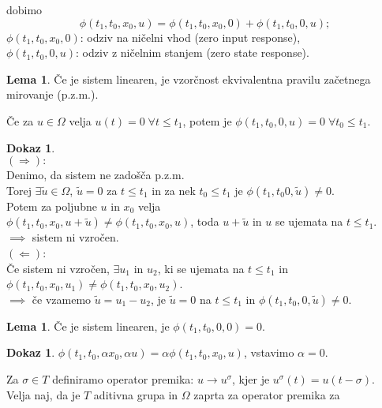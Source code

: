 \documentclass[a4paper, 12pt]{book}
\theoremstyle{definition}
\newtheorem{lemma}[counter]{Lema}
\newtheorem{pro}[counter]{Dokaz}
\theoremstyle{remark}
\begin{document}
dobimo
\begin{equation*}
    \phi(t_1, t_0, x_0, u) = \phi(t_1, t_0, x_0, 0) + \phi(t_1, t_0, 0, u);
\end{equation*}
$\phi(t_1, t_0, x_0, 0)$: odziv na ničelni vhod (zero input response), \\
$\phi(t_1, t_0, 0, u)$: odziv z ničelnim stanjem (zero state response). \\
\begin{lemma}
    Če je sistem linearen, je vzorčnost ekvivalentna pravilu začetnega mirovanje (p.z.m.).
\end{lemma}
Če za $u \in \Omega$ velja $u(t) = 0 \; \forall t \leq t_1$, potem je $\phi(t_1, t_0, 0, u) = 0 \; \forall t_0 \leq t_1$.
\begin{pro} \text{} \\
    $(\Rightarrow):$ \\
        Denimo, da sistem ne zadošča p.z.m. \\
        Torej $\exists \tilde{u} \in \Omega$, $\tilde{u} = 0$ za $t \leq t_1$
        in za nek $t_0 \leq t_1$ je $\phi(t_1, t_0 0, \tilde{u}) \neq 0$. \\
        Potem za poljubne $u$ in $x_0$ velja \\
        $\phi(t_1, t_0, x_0, u + \tilde{u}) \neq \phi(t_1, t_0, x_0, u)$,
        toda $u + \tilde{u}$ in $u$ se ujemata na $t \leq t_1$. \\
        $\implies$ sistem ni vzročen. \\
    $(\Leftarrow)$: \\
        Če sistem ni vzročen, $\exists u_1$ in $u_2$, ki se ujemata na $t \leq t_1$ in \\
        $\phi(t_1, t_0, x_0, u_1) \neq \phi(t_1, t_0, x_0, u_2)$. \\
        $\implies$ če vzamemo $\tilde{u} = u_1 - u_2$, je $\tilde{u} = 0$ na $t \leq t_1$ in $\phi(t_1, t_0, 0, \tilde{u}) \neq 0$.
\end{pro}
\begin{lemma}
    Če je sistem linearen, je $\phi(t_1, t_0, 0, 0) = 0$.
\end{lemma}
\begin{pro}
    $\phi(t_1, t_0, \alpha x_0, \alpha u) = \alpha \phi(t_1, t_0, x_0, u)$, vstavimo $\alpha = 0$.
\end{pro}
Za $\sigma \in T$ definiramo operator premika: $u \to u^{\sigma}$, kjer je $u^{\sigma}(t) = u(t - \sigma)$. \\
Velja naj, da je $T$ aditivna grupa in $\Omega$ zaprta za operator premika za \\
\end{document}
